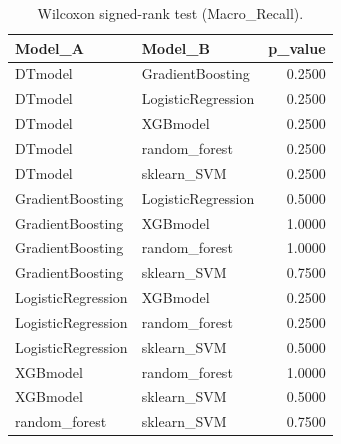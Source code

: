 \begin{table}[t]
\centering
\begin{tabular}{llr}
\toprule
Model_A & Model_B & p_value \\
\midrule
DTmodel & GradientBoosting & 0.2500 \\
DTmodel & LogisticRegression & 0.2500 \\
DTmodel & XGBmodel & 0.2500 \\
DTmodel & random_forest & 0.2500 \\
DTmodel & sklearn_SVM & 0.2500 \\
GradientBoosting & LogisticRegression & 0.5000 \\
GradientBoosting & XGBmodel & 1.0000 \\
GradientBoosting & random_forest & 1.0000 \\
GradientBoosting & sklearn_SVM & 0.7500 \\
LogisticRegression & XGBmodel & 0.2500 \\
LogisticRegression & random_forest & 0.2500 \\
LogisticRegression & sklearn_SVM & 0.5000 \\
XGBmodel & random_forest & 1.0000 \\
XGBmodel & sklearn_SVM & 0.5000 \\
random_forest & sklearn_SVM & 0.7500 \\
\bottomrule
\end{tabular}
\caption{Wilcoxon signed-rank test (Macro_Recall).}
\label{tab:wilcoxon_Macro_Recall}
\end{table}